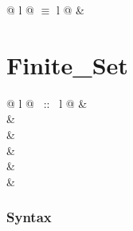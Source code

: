 \begin{isabellebody}
\begin{isamarkuptext}
\begin{tabular}{@ {} l @ {\quad$\equiv$\quad} l @ {}}
 & \\
\end{tabular}


\section{Finite\_Set}


\begin{supertabular}{@ {} l @ {~::~} l @ {}}
 & \\
 & \\
 & \\
 & \\
 & \\
 & \\
\end{supertabular}


\subsubsection*{Syntax}


\end{isamarkuptext}
\end{isabellebody}
